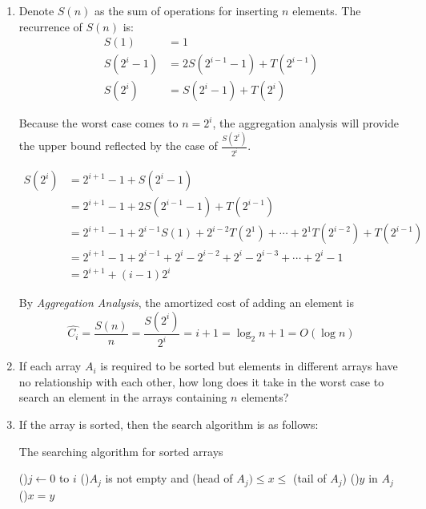 \documentclass[12pt,a4paper]{article}
\makeatletter
\newtheorem*{solution}{Solution}
\theoremstyle{definition}
\renewenvironment{solution}[1][Solution] {\par\pushQED{\qed}\normalfont\topsep6\p@\@plus6\p@\relax\trivlist\item[\hskip\labelsep\bfseries#1\@addpunct{.}]\ignorespaces}{\popQED\endtrivlist\@endpefalse} \makeatother
\makeatother
\begin{document}
\begin{enumerate}
\begin{enumerate}
\begin{solution}
			Denote $S(n)$ as the sum of operations for inserting $n$ elements. The recurrence of $S(n)$ is:
			\begin{align*}
				S(1) &= 1\\
				S(2^i-1) &= 2S(2^{i-1}-1) + T(2^{i-1})\\
				S(2^i) &= S(2^{i}-1) + T(2^i)
			\end{align*}

			Because the worst case comes to $n=2^i$, the aggregation analysis will provide the upper bound reflected by the case of $\frac{S(2^i)}{2^i}$.

			\begin{align*}
				S(2^i) &= 2^{i+1}-1 + S(2^i-1) \\
					&= 2^{i+1} - 1 + 2S(2^{i-1}-1) + T(2^{i-1})\\
					&= 2^{i+1} - 1 + 2^{i-1}S(1) + 2^{i-2}T(2^1) + \cdots + 2^1T(2^{i-2}) +T(2^{i-1})\\
					&= 2^{i+1} - 1 + 2^{i-1} + 2^i - 2^{i-2} + 2^i - 2^{i-3} + \cdots + 2^i - 1\\
					&= 2^{i+1} +(i-1)2^i
			\end{align*}

			By \emph{Aggregation Analysis}, the amortized cost of adding an element is
			\begin{equation*}
				\hat{C_i} =\frac{S(n)}{n}=\frac{S(2^i)}{2^i} = i+1 = \log_2 n + 1 = O(\log n)
			\end{equation*}
		\end{solution}
        \item If each array $A_i$ is required to be sorted but elements in different arrays have no relationship with each other, how long does it take in the worst case to search an element in the arrays containing $n$ elements? 
    
		\begin{solution}
			If the array is sorted, then the search algorithm is as follows:
			\begin{algorithm}[h]
				\caption{The searching algorithm for sorted arrays}
				\BlankLine
				\For(){$j\leftarrow 0$ to $i$}{
					\If(){$A_j$ is not empty and (head of $A_j) \leq x \leq$ (tail of $A_j$)}{
						\ForEach(){$y$ in $A_j$}{
							\lIf(){$x=y$}{
							}
						}
					}
				}
				\;
			\end{algorithm}


\end{solution}
\end{enumerate}
\end{enumerate}
\end{document}
